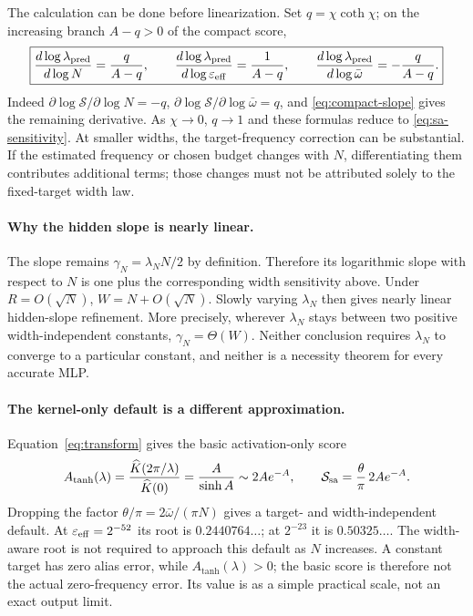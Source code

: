 \documentclass[11pt]{article}
\theoremstyle{definition}\newtheorem{definition}[theorem]{Definition}
\theoremstyle{remark}\newtheorem{remark}[theorem]{Remark}
\numberwithin{equation}{section}
\newcommand{\Sscore}{\mathcal S}
\newcommand{\Sa}{\mathcal S_{\rm sa}}
\begin{document}
The calculation can be done before linearization. Set $q=\chi\coth\chi$; on the increasing branch $A-q>0$ of the compact score,
\begin{equation}
 \boxed{
 \frac{d\log\lambda_{\rm pred}}{d\log N}=\frac{q}{A-q},\qquad
 \frac{d\log\lambda_{\rm pred}}{d\log\varepsilon_{\rm eff}}=\frac1{A-q},\qquad
 \frac{d\log\lambda_{\rm pred}}{d\log\bar\omega}=-\frac{q}{A-q}.}
 \label{eq:full-sensitivity}
\end{equation}
Indeed $\partial\log\Sscore/\partial\log N=-q$, $\partial\log\Sscore/\partial\log\bar\omega=q$, and \eqref{eq:compact-slope} gives the remaining derivative. As $\chi\to0$, $q\to1$ and these formulas reduce to \eqref{eq:sa-sensitivity}. At smaller widths, the target-frequency correction can be substantial. If the estimated frequency or chosen budget changes with $N$, differentiating them contributes additional terms; those changes must not be attributed solely to the fixed-target width law.

\paragraph{Why the hidden slope is nearly linear.}
The slope remains $\gamma_N=\lambda_NN/2$ by definition. Therefore its logarithmic slope with respect to $N$ is one plus the corresponding width sensitivity above. Under $R=O(\sqrt N)$, $W=N+O(\sqrt N)$. Slowly varying $\lambda_N$ then gives nearly linear hidden-slope refinement. More precisely, wherever $\lambda_N$ stays between two positive width-independent constants, $\gamma_N=\Theta(W)$. Neither conclusion requires $\lambda_N$ to converge to a particular constant, and neither is a necessity theorem for every accurate MLP.

\paragraph{The kernel-only default is a different approximation.}
Equation~\eqref{eq:transform} gives the basic activation-only score
\begin{equation}
 A_{\tanh}(\lambda)=\frac{\widehat K(2\pi/\lambda)}{\widehat K(0)}
 =\frac{A}{\sinh A}\sim2Ae^{-A},\qquad
 \Sa=\frac{\theta}{\pi}\,2Ae^{-A}.
 \label{eq:basic}
\end{equation}
Dropping the factor $\theta/\pi=2\bar\omega/(\pi N)$ gives a target- and width-independent default. At $\varepsilon_{\rm eff}=2^{-52}$ its root is $0.2440764\ldots$; at $2^{-23}$ it is $0.50325\ldots$. The width-aware root is not required to approach this default as $N$ increases. A constant target has zero alias error, while $A_{\tanh}(\lambda)>0$; the basic score is therefore not the actual zero-frequency error. Its value is as a simple practical scale, not an exact output limit.
\end{document}
